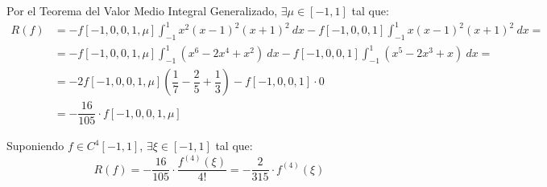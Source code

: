 \begin{ejercicio}
\begin{enumerate}
        Por el Teorema del Valor Medio Integral Generalizado, $\exists \mu\in [-1,1]$ tal que:
        \begin{align*}
            R(f) &= -f[-1, 0, 0, 1, \mu]\int_{-1}^1x^2(x-1)^2(x+1)^2\ dx - f[-1, 0, 0, 1]\int_{-1}^1x(x-1)^2(x+1)^2\ dx
            =\\&= -f[-1, 0, 0, 1, \mu]\int_{-1}^1(x^6-2x^4+x^2)\ dx - f[-1, 0, 0, 1]\int_{-1}^1(x^5-2x^3+x)\ dx
            =\\&= -2f[-1, 0, 0, 1, \mu]\left(\dfrac{1}{7}-\dfrac{2}{5}+\dfrac{1}{3}\right) - f[-1, 0, 0, 1]\cdot 0
            \\&= -\dfrac{16}{105}\cdot f[-1, 0, 0, 1, \mu]
        \end{align*}

        Suponiendo $f\in C^4[-1,1]$, $\exists \xi\in [-1,1]$ tal que:
        \begin{equation*}
            R(f) = -\dfrac{16}{105}\cdot \dfrac{f^{(4)}(\xi)}{4!}
            = -\dfrac{2}{315}\cdot f^{(4)}(\xi)
        \end{equation*}
    \end{enumerate}
\end{ejercicio}


